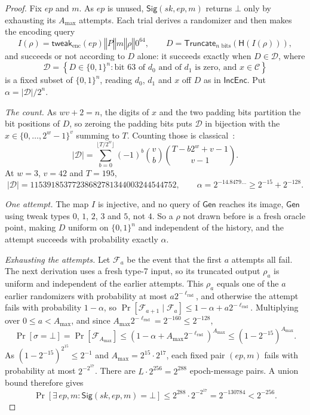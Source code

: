\documentclass[11pt]{article}
\theoremstyle{definition}
\theoremstyle{plain}
\theoremstyle{remark}
\newcommand{\bits}[1]{\{0,1\}^{#1}}
\newcommand{\IncEnc}{\mathsf{IncEnc}}
\newcommand{\Gen}{\mathsf{Gen}}
\newcommand{\Sig}{\mathsf{Sig}}
\newcommand{\hash}{\mathsf{H}}
\newcommand{\Truncate}{\mathsf{Truncate}}
\newcommand{\concat}{\mathbin\Vert}
\newcommand{\ep}{\mathit{ep}}
\newcommand{\sk}{\mathit{sk}}
\newcommand{\lrnd}{\ell_{\mathrm{rnd}}}
\newcommand{\amax}{A_{\max}}
\begin{document}
\begin{proof}
Fix $\ep$ and $m$. As $\ep$ is unused, $\Sig(\sk,\ep,m)$ returns $\bot$ only by exhausting its $\amax$ attempts. Each trial derives a randomizer and then makes the encoding query
\[
  I(\rho)=\mathsf{tweak}_{\mathrm{enc}}(\ep)\concat P\concat m\concat\rho\concat0^{64},
  \qquad D=\Truncate_{n\text{ bits}}\!\left(\hash(I(\rho))\right),
\]
and succeeds or not according to $D$ alone: it succeeds exactly when $D\in\mathcal D$, where
\[
  \mathcal D=\left\{D\in\bits n:\text{bit }63\text{ of }d_0\text{ and of }d_1\text{ is zero, and }x\in\mathcal C\right\}
\]
is a fixed subset of $\bits n$, reading $d_0$, $d_1$ and $x$ off $D$ as in $\IncEnc$. Put $\alpha=|\mathcal D|/2^n$.

\emph{The count.} As $wv+2=n$, the digits of $x$ and the two padding bits partition the bit positions of $D$, so zeroing the padding bits puts $\mathcal D$ in bijection with the $x\in\{0,\ldots,2^w-1\}^v$ summing to $T$. Counting those is classical~\cite{Comtet74}:
\[
  |\mathcal D|=\sum_{b=0}^{\lfloor T/2^w\rfloor}(-1)^b\binom{v}{b}\binom{T-b2^w+v-1}{v-1}.
\]
At $w=3$, $v=42$ and $T=195$,
\[
  |\mathcal D|=11539185377238682781344003244544752,\qquad \alpha=2^{-14.8479\ldots}\geq2^{-15}+2^{-128}.
\]

\emph{One attempt.} The map $I$ is injective, and no query of $\Gen$ reaches its image, $\Gen$ using tweak types $0$, $1$, $2$, $3$ and $5$, not $4$. So a $\rho$ not drawn before is a fresh oracle point, making $D$ uniform on $\bits n$ and independent of the history, and the attempt succeeds with probability exactly $\alpha$.

\emph{Exhausting the attempts.} Let $\mathcal F_a$ be the event that the first $a$ attempts all fail. The next derivation uses a fresh type-7 input, so its truncated output $\rho_a$ is uniform and independent of the earlier attempts. This $\rho_a$ equals one of the $a$ earlier randomizers with probability at most $a2^{-\lrnd}$, and otherwise the attempt fails with probability $1-\alpha$, so $\Pr[\mathcal F_{a+1}\mid\mathcal F_a]\leq1-\alpha+a2^{-\lrnd}$. Multiplying over $0\leq a<\amax$, and since $\amax2^{-\lrnd}=2^{-160}\leq2^{-128}$,
\[
  \Pr[\sigma=\bot]=\Pr[\mathcal F_{\amax}]\leq\left(1-\alpha+\amax2^{-\lrnd}\right)^{\amax}\leq\left(1-2^{-15}\right)^{\amax}.
\]
As $\left(1-2^{-15}\right)^{2^{15}}\leq2^{-1}$ and $\amax=2^{15}\cdot2^{17}$, each fixed pair $(\ep,m)$ fails with probability at most $2^{-2^{17}}$. There are $L\cdot2^{256}=2^{288}$ epoch-message pairs. A union bound therefore gives
\[
  \Pr[\exists\,\ep,m:\Sig(\sk,\ep,m)=\bot]
  \leq2^{288}\cdot2^{-2^{17}}
  =2^{-130784}<2^{-256}.
\]
\end{proof}



\end{document}
